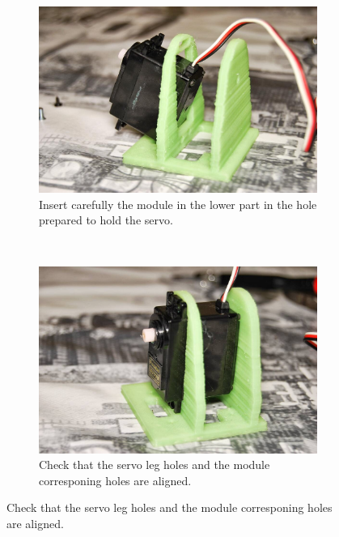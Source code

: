 \begin{figure}[H]
        \centering
        \begin{subfigure}[b]{0.46\textwidth}
                \centering
                \includegraphics[width=\textwidth]{images/REPY2_assembly_03.jpg}
                \caption{Insert carefully the module in the lower part in the hole prepared to hold the servo.\\}
                \label{fig:hardware_assembly_03}
        \end{subfigure}
        ~
        \begin{subfigure}[b]{0.46\textwidth}
                \centering
                \includegraphics[width=\textwidth]{images/REPY2_assembly_04.jpg}
                \caption{Check that the servo leg holes and the module corresponing holes are aligned.\\}
                \label{fig:hardware_assembly_04}

\end{subfigure}
\end{figure}
